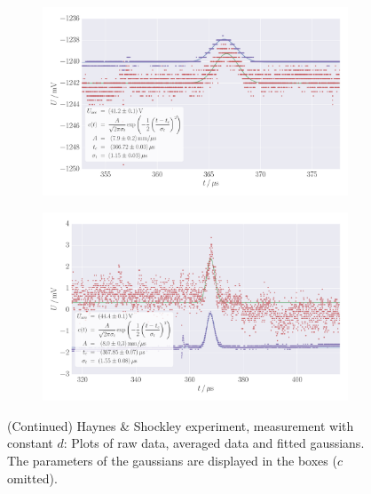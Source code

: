 \begin{figure}
    \centering
    \begin{subfigure}[b]{\pltw}
        \includegraphics[width=1.0\linewidth]{figures/haynes_shockley_raw_U_63}
        \caption{}
        \label{fig:h_s_raw_U_63}
    \end{subfigure}
    \begin{subfigure}[b]{\pltw}
        \includegraphics[width=1.0\linewidth]{figures/haynes_shockley_raw_U_43}
        \caption{}
        \label{fig:h_s_raw_U_43}
    \end{subfigure}
    \caption{
        (Continued)
        Haynes \& Shockley experiment, measurement with constant $d$:
        Plots of raw data, averaged data and fitted gaussians. 
        The parameters of the gaussians are displayed in the boxes 
        ($c$ omitted).
        }
    \label{fig:h_s_raw_plots_U_63_43}
\end{figure}
